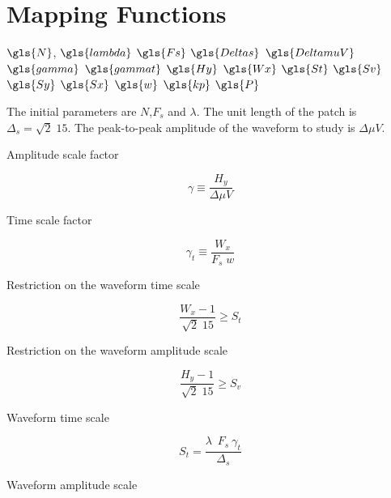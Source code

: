 \section{Mapping Functions}


$\gls{N}$, 
$\gls{lambda}$
$\gls{Fs}$
$\gls{Deltas}$
$\gls{DeltamuV}$
$\gls{gamma}$
$\gls{gammat}$
$\gls{Hy}$
$\gls{Wx}$
$\gls{St}$
$\gls{Sv}$
$\gls{Sy}$
$\gls{Sx}$
$\gls{w}$
$\gls{kp}$
$\gls{P}$

The initial parameters are $N$,$F_s$ and $\lambda$.  The unit length of the patch is $\Delta_s = \sqrt{2} \; 15$.  The peak-to-peak amplitude of the waveform to study is $ \Delta \mu V $.

Amplitude scale factor

\begin{equation}
\gamma \equiv \frac{H_y}{\Delta \mu V}  
\label{eq:gammadefinition}
\end{equation}

Time scale factor

\begin{equation}
\gamma_t \equiv \frac{W_x}{F_s \; w}  
\label{eq:gammatdefinition}
\end{equation}

%

Restriction on the waveform time scale

\begin{equation}
\frac{W_x-1}{\sqrt{2} \; 15}  \geq S_t 
\label{eq:restriction1}
\end{equation}

Restriction on the waveform amplitude scale

\begin{equation}
\frac{H_y-1}{\sqrt{2} \; 15}  \geq S_v 
\label{eq:restriction2}
\end{equation}

Waveform time scale

\begin{equation}
S_t = \frac{ \lambda \;  \  F_s \ \gamma_t }{\Delta_s}
\label{eq:mapping2}
\end{equation}

Waveform amplitude scale

